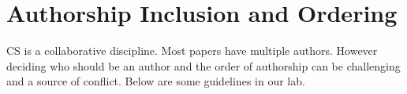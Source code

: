 \documentclass[oneside,11pt]{book}
\begin{document}



\section{Authorship Inclusion and Ordering}
CS is a collaborative discipline. Most papers have multiple authors. However deciding who should be an author and the order of authorship can be challenging and a source of conflict. Below are some guidelines in our lab. 
\end{document}
